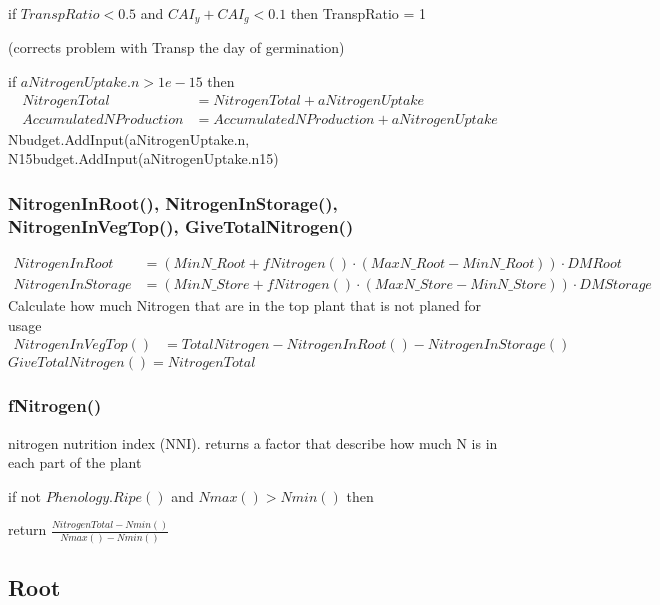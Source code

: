 \documentclass[%
]{scrartcl}
\begin{document}
   if $TranspRatio<0.5$ and $CAI_y+CAI_g<0.1$ then TranspRatio = 1
          
   (corrects problem with Transp the day of germination)
     
   if $aNitrogenUptake.n > 1e-15$ then
   \begin{align*}
      NitrogenTotal & = NitrogenTotal + aNitrogenUptake \\
      AccumulatedNProduction & = AccumulatedNProduction + aNitrogenUptake 
   \end{align*}
      Nbudget.AddInput(aNitrogenUptake.n,                  
    N15budget.AddInput(aNitrogenUptake.n15)

   
  
  
\subsubsection*{NitrogenInRoot(), NitrogenInStorage(), NitrogenInVegTop(), GiveTotalNitrogen() }
		\begin{align*}		
  NitrogenInRoot & =  (MinN\_Root +fNitrogen()  \cdot  (MaxN\_Root -MinN\_Root))  \cdot  DMRoot   \\
  NitrogenInStorage & =  (MinN\_Store + fNitrogen()  \cdot  (MaxN\_Store-MinN\_Store))  \cdot   DMStorage  
  \end{align*}  
%
Calculate how much Nitrogen that are in the top plant that is not planed for usage
	\begin{align*}
	NitrogenInVegTop() & = TotalNitrogen-NitrogenInRoot()-NitrogenInStorage()  
  \end{align*}   
  $GiveTotalNitrogen() = NitrogenTotal$ 
 
\subsubsection*{fNitrogen()}
\citep{olesen2002crop} nitrogen nutrition index (NNI). 
returns a factor that describe how much N is 
in each part of the plant
	
  if not $Phenology.Ripe()$ and $Nmax()>Nmin()$ then     
 
   return  %
$\tfrac{NitrogenTotal-Nmin()}{Nmax()-Nmin()}$
 
\subsection{Root}
\end{document}
